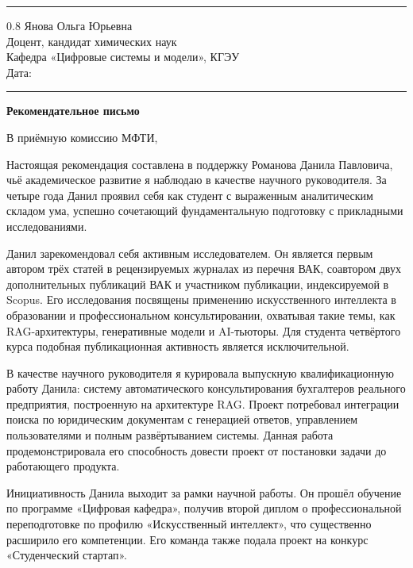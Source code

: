 \documentclass[a4paper,12pt]{article}
\begin{document}
\vspace{4pt}
\noindent\rule{\textwidth}{0.8pt}

\begin{flushright}
  \begin{spacing}{0.8}
    Янова Ольга Юрьевна\\
    Доцент, кандидат химических наук\\
    Кафедра «Цифровые системы и модели», КГЭУ\\[6pt]
    Дата: \rule{4cm}{0.4pt}
  \end{spacing}
\end{flushright}

\begin{center}
  {\Large\bfseries Рекомендательное письмо}
\end{center}

В приёмную комиссию МФТИ,

Настоящая рекомендация составлена в поддержку Романова Данила Павловича, чьё академическое развитие я наблюдаю в качестве научного руководителя. За четыре года Данил проявил себя как студент с выраженным аналитическим складом ума, успешно сочетающий фундаментальную подготовку с прикладными исследованиями.

Данил зарекомендовал себя активным исследователем. Он является первым автором трёх статей в рецензируемых журналах из перечня ВАК, соавтором двух дополнительных публикаций ВАК и участником публикации, индексируемой в Scopus. Его исследования посвящены применению искусственного интеллекта в образовании и профессиональном консультировании, охватывая такие темы, как RAG-архитектуры, генеративные модели и AI-тьюторы. Для студента четвёртого курса подобная публикационная активность является исключительной.

В качестве научного руководителя я курировала выпускную квалификационную работу Данила: систему автоматического консультирования бухгалтеров реального предприятия, построенную на архитектуре RAG. Проект потребовал интеграции поиска по юридическим документам с генерацией ответов, управлением пользователями и полным развёртыванием системы. Данная работа продемонстрировала его способность довести проект от постановки задачи до работающего продукта.

Инициативность Данила выходит за рамки научной работы. Он прошёл обучение по программе «Цифровая кафедра», получив второй диплом о профессиональной переподготовке по профилю «Искусственный интеллект», что существенно расширило его компетенции. Его команда также подала проект на конкурс «Студенческий стартап».
\end{document}
